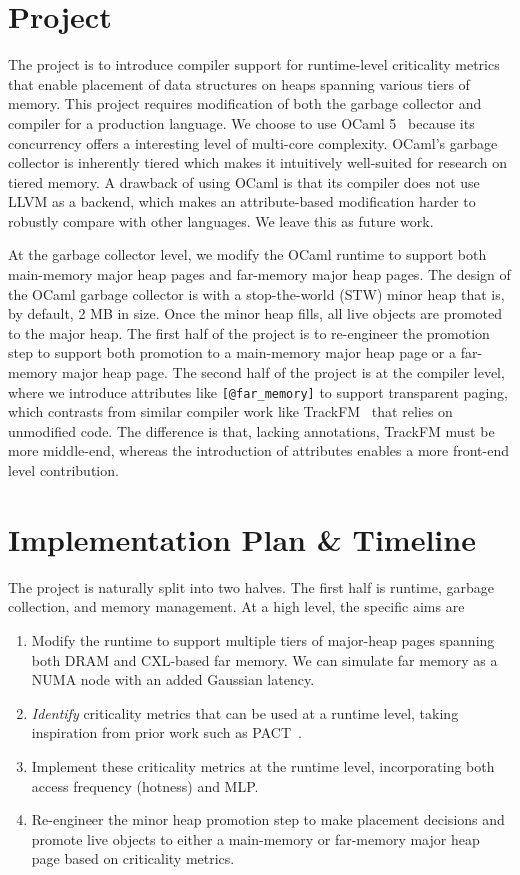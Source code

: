 \documentclass[sigconf]{acmart}
\begin{document}
\section{Project}

The project is to introduce compiler support for runtime-level criticality metrics that enable placement of data structures on heaps spanning various tiers of memory. This project requires modification of both the garbage collector and compiler for a production language. We choose to use OCaml 5~\cite{ocaml5gc2020} because its concurrency offers a interesting level of multi-core complexity. OCaml's garbage collector is inherently tiered which makes it intuitively well-suited for research on tiered memory. A drawback of using OCaml is that its compiler does not use LLVM as a backend, which makes an attribute-based modification harder to robustly compare with other languages. We leave this as future work.

At the garbage collector level, we modify the OCaml runtime to support both main-memory major heap pages and far-memory major heap pages. The design of the OCaml garbage collector is with a stop-the-world (STW) minor heap that is, by default, 2 MB in size. Once the minor heap fills, all live objects are promoted to the major heap. The first half of the project is to re-engineer the promotion step to support both promotion to a main-memory major heap page  or a far-memory major heap page. The second half of the project is at the compiler level, where we introduce attributes like \texttt{[@far\_memory]} to support transparent paging, which contrasts from similar compiler work like TrackFM~\cite{trackfm2024} that relies on unmodified code. The difference is that, lacking annotations, TrackFM must be more middle-end, whereas the introduction of attributes enables a more front-end level contribution.

\section{Implementation Plan \& Timeline}

The project is naturally split into two halves. The first half is runtime, garbage collection, and memory management. At a high level, the specific aims are
\begin{enumerate}
  \item Modify the runtime to support multiple tiers of major-heap pages spanning both DRAM and CXL-based far memory. We can simulate far memory as a NUMA node with an added Gaussian latency.
  \item \textit{Identify} criticality metrics that can be used at a runtime level, taking inspiration from prior work such as PACT~\cite{pact2026}.
  \item Implement these criticality metrics at the runtime level, incorporating both access frequency (hotness) and MLP.
  \item Re-engineer the minor heap promotion step to make placement decisions and promote live objects to either a main-memory or far-memory major heap page based on criticality metrics.
\end{enumerate}
\end{document}
